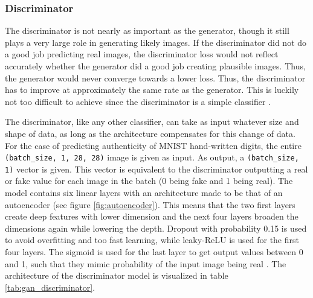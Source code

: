 \documentclass[12pt, fleqn, titlepage]{article}
\begin{document}
\subsubsection{Discriminator}
The discriminator is not nearly as important as the generator, though it still plays a very large role in generating likely images. If the discriminator did not do a good job predicting real images, the discriminator loss would not reflect accurately whether the generator did a good job creating plausible images. Thus, the generator would never converge towards a lower loss. Thus, the discriminator has to improve at approximately the same rate as the generator. This is luckily not too difficult to achieve since the discriminator is a simple classifier \cite{developers.google_discriminator, developers.google_training}.

The discriminator, like any other classifier, can take as input whatever size and shape of data, as long as the architecture compensates for this change of data. For the case of predicting authenticity of MNIST hand-written digits, the entire \texttt{(batch\_size, 1, 28, 28)} image is given as input. As output, a \texttt{(batch\_size, 1)} vector is given. This vector is equivalent to the discriminator outputting a real or fake value for each image in the batch (0 being fake and 1 being real). The model contains six linear layers with an architecture made to be that of an autoencoder (see figure \ref{fig:autoencoder}). This means that the two first layers create deep features with lower dimension and the next four layers broaden the dimensions again while lowering the depth. Dropout with probability 0.15 is used to avoid overfitting and too fast learning, while leaky-ReLU is used for the first four layers. The sigmoid is used for the last layer to get output values between 0 and 1, such that they mimic probability of the input image being real \cite{pathmind_gen_disc_architecture}. The architecture of the discriminator model is visualized in table \ref{tab:gan_discriminator}.
\end{document}
